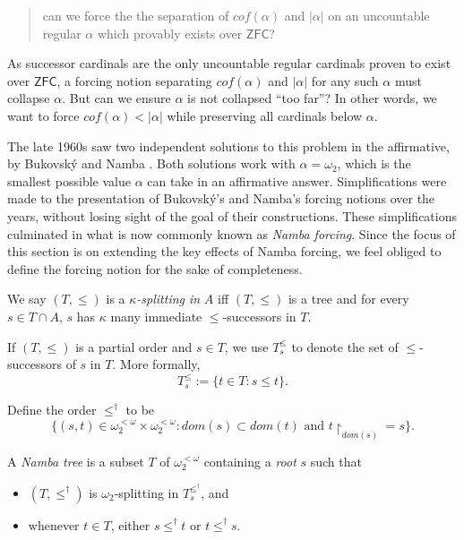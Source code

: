 \documentclass[12pt]{article}
\numberwithin{equation}{section}
\begin{document}
\begin{quote}
    can we force the the separation of $cof(\alpha)$ and $|\alpha|$ on an uncountable regular $\alpha$ which provably exists over $\mathsf{ZFC}$?
\end{quote}

As successor cardinals are the only uncountable regular cardinals proven to exist over $\mathsf{ZFC}$, a forcing notion separating $cof(\alpha)$ and $|\alpha|$ for any such $\alpha$ must collapse $\alpha$. But can we ensure $\alpha$ is not collapsed ``too far''? In other words, we want to force $cof(\alpha) < |\alpha|$ while preserving all cardinals below $\alpha$.

The late 1960s saw two independent solutions to this problem in the affirmative, by Bukovsk\'{y} \cite{bukovsky} and Namba \cite{namba}. Both solutions work with $\alpha = \omega_2$, which is the smallest possible value $\alpha$ can take in an affirmative answer. Simplifications were made to the presentation of Bukovsk\'{y}'s and Namba's forcing notions over the years, without losing sight of the goal of their constructions. These simplifications culminated in what is now commonly known as \emph{Namba forcing}. Since the focus of this section is on extending the key effects of Namba forcing, we feel obliged to define the forcing notion for the sake of completeness.

\begin{defi}
We say $(T, \leq)$ is a $\kappa$\emph{-splitting in} $A$ iff $(T, \leq)$ is a tree and for every $s \in T \cap A$, $s$ has $\kappa$ many immediate $\leq$-successors in $T$. 
\end{defi}

\begin{defi}
If $(T, \leq)$ is a partial order and $s \in T$, we use $T_s^{\leq}$ to denote the set of $\leq$-successors of $s$ in $T$. More formally, $$T_s^{\leq} := \{t \in T : s \leq t\}.$$ 
\end{defi}

\begin{defi}
Define the order $\leq^{\dagger}$ to be $$\{(s, t) \in \omega_2^{< \omega} \times \omega_2^{< \omega} : dom(s) \subset dom(t) \text{ and } t \! \restriction_{dom(s)} = s\}.$$
\end{defi}

\begin{defi}
A \emph{Namba tree} is a subset $T$ of $\omega_2^{< \omega}$ containing a \emph{root} $s$ such that
\begin{itemize}
    \item $(T, \leq^{\dagger})$ is $\omega_2$-splitting in $T_s^{\leq^{\dagger}}$, and
    \item whenever $t \in T$, either $s \leq^{\dagger} t$ or $t \leq^{\dagger} s$. 
\end{itemize}
\end{defi}
\end{document}
